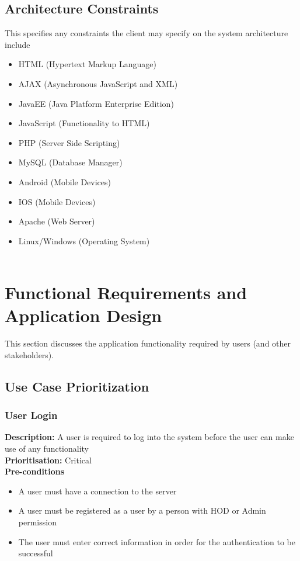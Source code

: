 \documentclass[a4paper]{article}
\begin{document}
	\subsection{Architecture Constraints}
	This specifies any constraints the client may specify on the system architecture include
	\begin{itemize}
		\item HTML (Hypertext Markup Language)
		\item AJAX (Asynchronous JavaScript and XML)
		\item JavaEE (Java Platform Enterprise Edition)
		\item JavaScript (Functionality to HTML)
		\item PHP (Server Side Scripting)
		\item MySQL (Database Manager)
		\item Android (Mobile Devices)
		\item IOS (Mobile Devices)
		\item Apache (Web Server)
		\item Linux/Windows (Operating System)
		\\
		\\
	\end{itemize}
	\pagebreak
	\section{Functional Requirements and Application Design}
	This section discusses the application functionality required by users (and other stakeholders).
	\subsection{Use Case Prioritization}
	\subsubsection{User Login}
	\textbf{Description:}  A user is required to log into the system before the user can make use of any functionality
	\\
    \textbf{Prioritisation:} Critical\\
    
    
      \textbf{Pre-conditions}
    \begin{itemize}
        \item A user must have a connection to the server
        \item A user must be registered as a user by a person with HOD or Admin permission
        \item The user must enter correct information in order for the authentication to be successful
    \end{itemize}
    
\end{document}
